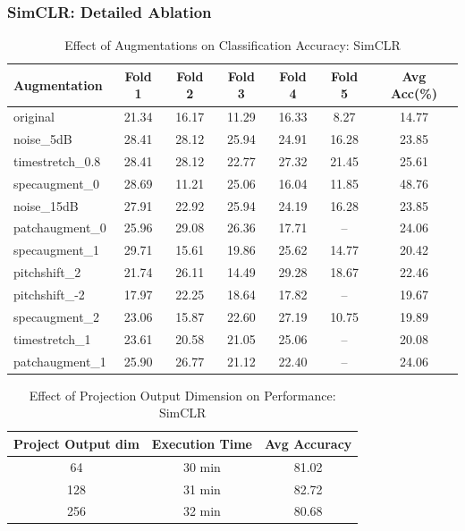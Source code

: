 \documentclass[11pt]{article}
\begin{document}
\subsubsection{SimCLR: Detailed Ablation}
\begin{table}[ht]
    \centering
    \begin{tabular}{lcccccc}
    \toprule
    \textbf{Augmentation} & \textbf{Fold 1} & \textbf{Fold 2} & \textbf{Fold 3} & \textbf{Fold 4} & \textbf{Fold 5} & \textbf{Avg Acc(\%)} \\
    \midrule
    original & 21.34 & 16.17 & 11.29 & 16.33 & 8.27 & 14.77 \\
    noise\_5dB & 28.41 & 28.12 & 25.94 & 24.91 & 16.28 & 23.85 \\
    timestretch\_0.8 & 28.41 & 28.12 & 22.77 & 27.32 & 21.45 & 25.61 \\
    specaugment\_0 & 28.69 & 11.21 & 25.06 & 16.04 & 11.85 & 48.76 \\
    noise\_15dB & 27.91 & 22.92 & 25.94 & 24.19 & 16.28 & 23.85 \\
    patchaugment\_0 & 25.96 & 29.08 & 26.36 & 17.71 & -- & 24.06 \\
    specaugment\_1 & 29.71 & 15.61 & 19.86 & 25.62 & 14.77 & 20.42 \\
    pitchshift\_2 & 21.74 & 26.11 & 14.49 & 29.28 & 18.67 & 22.46 \\
    pitchshift\_-2 & 17.97 & 22.25 & 18.64 & 17.82 & -- & 19.67 \\
    specaugment\_2 & 23.06 & 15.87 & 22.60 & 27.19 & 10.75 & 19.89 \\
    timestretch\_1 & 23.61 & 20.58 & 21.05 & 25.06 & -- & 20.08 \\
    patchaugment\_1 & 25.90 & 26.77 & 21.12 & 22.40 & -- & 24.06 \\
    \bottomrule
    \end{tabular}
    \caption{Effect of Augmentations on Classification Accuracy: SimCLR}
\end{table}
\begin{table}[ht]
    \centering
    \begin{tabular}{ccc}
    \toprule
    \textbf{Project Output dim} & \textbf{Execution Time} & \textbf{Avg Accuracy} \\
    \midrule
    64 & 30 min & 81.02 \\
    128 & 31 min & 82.72 \\
    256 & 32 min & 80.68 \\
    \bottomrule
    \end{tabular}
    \caption{Effect of Projection Output Dimension on Performance: SimCLR}
\end{table}
\end{document}
